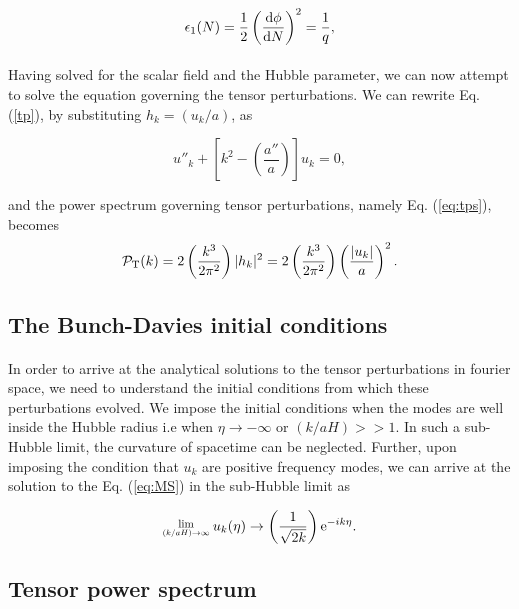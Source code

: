 \documentclass[12pt,a4paper,oneside]{book}
\newcommand{\Lim}[1]{\raisebox{0.5ex}{\scalebox{0.8}{$\displaystyle \lim_{#1}\;$}}}
\begin{document}
\begin{equation}
\epsilon_1(N) = \frac{1}{2}\left(\frac{{\rm d}\phi}{{\rm d} N}\right)^2 = \frac{1}{q},
\end{equation}

\paragraph*{} Having solved for the scalar field and the Hubble parameter, we can now attempt to solve the 
equation governing the tensor perturbations. We can rewrite Eq. (\ref{tp}), by substituting $h_k = \left(u_k/a\right)$, as

\begin{equation}\label{eq:MS}
u''_k + \left[k^2 - \left(\frac{a''}{a}\right)\right]u_k = 0,
\end{equation}

\noindent and the power spectrum governing tensor perturbations, namely Eq. (\ref{eq:tps}), becomes
\begin{equation}
{\mathcal{P}}_{\rm T}(k) = 2 \left(\frac{k^3}{2\pi^2}\right) |h_k|^2 = 2 \left(\frac{k^3}{2\pi^2}\right) \left(\frac{|u_k|}{a}\right)^2.
\end{equation}

\subsection{The Bunch-Davies initial conditions}

\paragraph*{} In order to arrive at the analytical solutions to the tensor perturbations in fourier space, we need 
to understand the initial conditions from which these perturbations evolved. We impose the initial conditions 
when the modes are well inside the Hubble radius i.e when $\eta \rightarrow -\infty$ or $(k/aH) >> 1$.
In such a sub-Hubble limit,  the curvature of spacetime can be neglected.
Further, upon imposing the condition that $u_k$ are positive frequency modes,
 we can arrive at the solution to the Eq. (\ref{eq:MS}) in the sub-Hubble limit as

\begin{equation}\label{eq:bd}
\Lim{\left(k/aH\right) \rightarrow \infty} u_k(\eta) \rightarrow \left(\frac{1}{\sqrt{2k}}\right){\rm e}^{-ik\eta}.
\end{equation}

\subsection{Tensor power spectrum}
\end{document}
